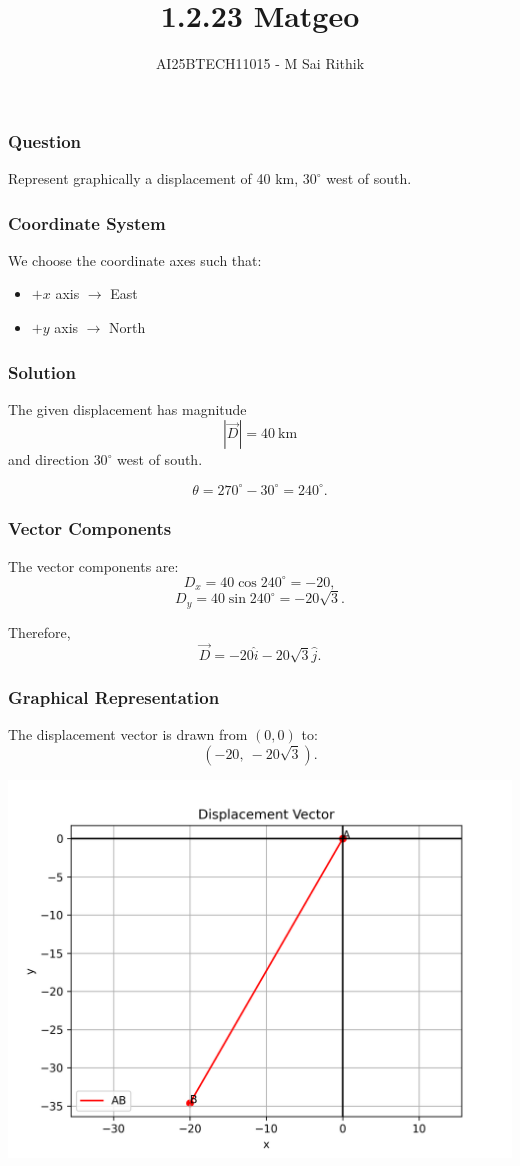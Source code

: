 \documentclass{beamer}
\title{1.2.23 Matgeo}
\author{AI25BTECH11015 - M Sai Rithik}
\date{}
\begin{document}
\frame{\titlepage}

\begin{frame}
\frametitle{Question}
Represent graphically a displacement of 40 km, $30^{\circ}$ west of south.
\end{frame}

\begin{frame}
\frametitle{Coordinate System}
We choose the coordinate axes such that:
\begin{itemize}
    \item $+x$ axis $\to$ East
    \item $+y$ axis $\to$ North
\end{itemize}
\end{frame}

\begin{frame}
\frametitle{Solution}
The given displacement has magnitude
\[
|\vec{D}| = 40 \ \text{km}
\]
and direction $30^{\circ}$ west of south.  

\[
\theta = 270^{\circ} - 30^{\circ} = 240^{\circ}.
\]
\end{frame}

\begin{frame}
\frametitle{Vector Components}
The vector components are:
\[
D_x = 40 \cos 240^{\circ} = -20,
\]
\[
D_y = 40 \sin 240^{\circ} = -20\sqrt{3}.
\]

Therefore,
\[
\vec{D} = -20\hat{i} - 20\sqrt{3}\hat{j}.
\]
\end{frame}

\begin{frame}
\frametitle{Graphical Representation}
The displacement vector is drawn from $(0,0)$ to:
\[
(-20, \ -20\sqrt{3}).
\]

\begin{center}
\includegraphics[width=0.6\linewidth]{figs/fig.png}
\end{center}
\end{frame}
\end{document}
